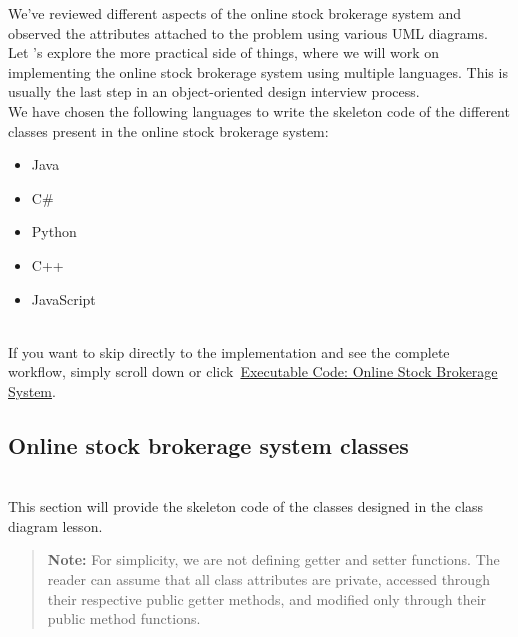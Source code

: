 

We've reviewed different aspects of the online stock brokerage system and observed the attributes attached to the problem using various UML diagrams. Let 's explore the more practical side of things, where we will work on implementing the online stock brokerage system using multiple languages. This is usually the last step in an object-oriented design interview process.
\\
We have chosen the following languages to write the skeleton code of the different classes present in the online stock brokerage system:

\begin{itemize}
\item
\protect{}\label{hK8rctAX5bkWJx4CsuxKu}
Java
\item
\protect{}\label{8-N6jGwaULXxsFZOq1Gdl}
C\#
\item
\protect{}\label{LRHsGb6DrwjRFCF60Sw7z}
Python
\item
\protect{}\label{3-08WR2ZhsdxgOwHuHWiM}
C++
\item
\protect{}\label{4fzmPg7_DQSw90tlPrno0}
JavaScript
\end{itemize}
\\
If you want to skip directly to the implementation and see the complete workflow, simply scroll down or click~\hyperref[Executable-code-Online-stock-brokerage-system]{Executable Code: Online Stock Brokerage System}.

\subsection{Online stock brokerage system classes}\label{iB16EEgsaXif-uU-HRj7B}
\\
This section will provide the skeleton code of the classes designed in the class diagram lesson.
\begin{quote}
\textbf{Note:} For simplicity, we are not defining getter and setter functions. The reader can assume that all class attributes are private, accessed through their respective public getter methods, and modified only through their public method functions.
\end{quote}
